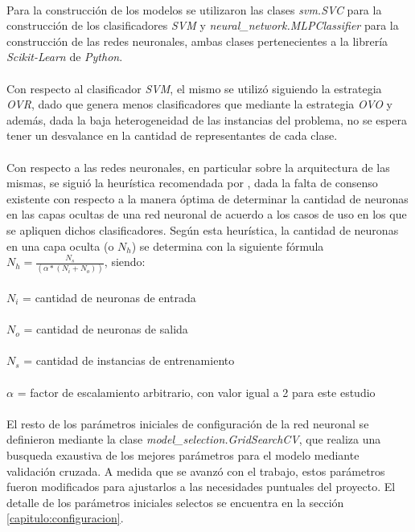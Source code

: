 \paragraph{} Para la construcción de los modelos se utilizaron las clases \textit{svm.SVC} para la construcción de los clasificadores \textit{SVM} y \textit{neural\_network.MLPClassifier} para la construcción de las redes neuronales, ambas clases pertenecientes a la librería \textit{Scikit-Learn} de \textit{Python}.

\paragraph{} Con respecto al clasificador \textit{SVM}, el mismo se utilizó siguiendo la estrategia \textit{OVR}, dado que genera menos clasificadores que mediante la estrategia \textit{OVO} y además, dada la baja heterogeneidad de las instancias del problema, no se espera tener un desvalance en la cantidad de representantes de cada clase.

\paragraph{} Con respecto a las redes neuronales, en particular sobre la arquitectura de las mismas, se siguió la heurística recomendada por \citet{bib-heuristic-hobs}, dada la falta de consenso existente con respecto a la manera óptima de determinar la cantidad de neuronas en las capas ocultas de una red neuronal de acuerdo a los casos de uso en los que se apliquen dichos clasificadores. Según esta heurística, la cantidad de neuronas en una capa oculta (o $N_h$) se determina con la siguiente fórmula $N_h = \frac{N_s} {(\alpha * (N_i + N_o))}$, siendo:
\\
\\
$N_i$ = cantidad de neuronas de entrada
\\
\\
$N_o$ = cantidad de neuronas de salida
\\
\\
$N_s$ = cantidad de instancias de entrenamiento
\\
\\
$\alpha$ = factor de escalamiento arbitrario, con valor igual a 2 para este estudio

\paragraph{} El resto de los parámetros iniciales de configuración de la red neuronal se definieron mediante la clase \textit{model\_selection.GridSearchCV}, que realiza una busqueda exaustiva de los mejores parámetros para el modelo mediante validación cruzada. A medida que se avanzó con el trabajo, estos parámetros fueron modificados para ajustarlos a las necesidades puntuales del proyecto. El detalle de los parámetros iniciales selectos se encuentra en la sección \ref{capitulo:configuracion}.

